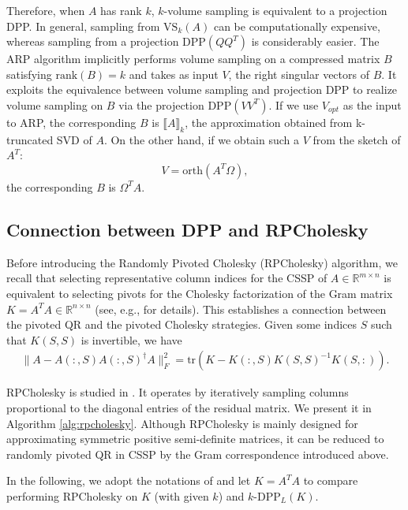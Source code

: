 \documentclass[11pt]{article}
\newcommand{\be}{\begin{eqnarray}}
\newcommand{\ee}{\end{eqnarray}}
\newcommand{\R}{\mathbb{R}}
\newcommand{\Rnn}{\mathbb{R}^{n\times n}}
\newcommand{\<}{\langle}
\renewcommand{\>}{\rangle}
\begin{document}
Therefore, when $A$ has rank $k$, $k$-volume sampling is equivalent to a projection DPP. In general, sampling from $\mathrm{VS}_k(A)$ can be computationally expensive, 
whereas sampling from a projection $\mathrm{DPP}(QQ^T)$ is considerably easier. The ARP algorithm implicitly performs volume sampling on a compressed matrix $B$ satisfying $\mathrm{rank}(B) = k$ and takes as input $V$, the right singular vectors of $B$. It exploits the equivalence between volume sampling and projection DPP to realize volume sampling on $B$ via the projection $\mathrm{DPP}(VV^T)$. If we use $V_{opt}$ as the input to ARP, the corresponding $B$ is $\llbracket A \rrbracket_k$, the approximation obtained from k-truncated SVD of $A$. On the other hand, if we  obtain such a $V$ from the sketch of $A^T$:
\[
V = \mathrm{orth}(A^T\Omega),
\]
the corresponding $B$ is $\Omega^T A$. 

\subsection{Connection between DPP and RPCholesky}
\label{sec:rpc_dpp_connection}

Before introducing the Randomly Pivoted Cholesky (RPCholesky) algorithm, we recall that selecting representative column indices for the CSSP of $A\in \R^{m\times n}$ is equivalent to selecting pivots for the Cholesky factorization of the Gram matrix $K = A^TA\in \Rnn$ (see, e.g., \cite{Higham1990Cholesky,epperly2024gram} for details). This establishes a connection between the pivoted QR and the pivoted Cholesky strategies. Given some indices $S$ such that $K(S,S)$ is invertible, we have 
\be
\|A - A(:,S)A(:,S)^{\dagger} A\|_F^2 = \mathrm{tr}(K - K(:,S)K(S,S)^{-1}K(S,:)).
\ee 

RPCholesky is studied in \cite{RPCholesky}. It operates by iteratively sampling columns proportional to the diagonal entries of the residual matrix. We present it in Algorithm \ref{alg:rpcholesky}. Although RPCholesky is mainly designed for approximating symmetric positive semi-definite matrices, it can be reduced to randomly pivoted QR in CSSP by the Gram correspondence introduced above.

In the following, we adopt the notations of \cite{RPCholesky} and let $K = A^TA$ to compare performing RPCholesky on $K$ (with given $k$) and $k\text{-}\mathrm{DPP}_L(K)$.
\end{document}
